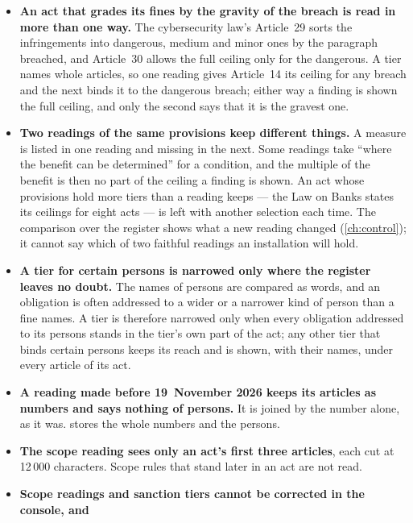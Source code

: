 \begin{itemize}
    law what Article~83(4) and (5) of the GDPR lists: only an article of the act being read
    is given with its sanction provisions. Such a tier names the article that holds the list
    and reaches no finding; the finding is shown the regulation's own ceiling.
  \item \textbf{An act that grades its fines by the gravity of the breach is read in more
    than one way.} The cybersecurity law's Article~29 sorts the infringements into dangerous,
    medium and minor ones by the paragraph breached, and Article~30 allows the full ceiling
    only for the dangerous. A tier names whole articles, so one reading gives Article~14 its
    ceiling for any breach and the next binds it to the dangerous breach; either way a
    finding is shown the full ceiling, and only the second says that it is the gravest one.
  \item \textbf{Two readings of the same provisions keep different things.} A measure is
    listed in one reading and missing in the next. Some readings take \enquote{where the
    benefit can be determined} for a condition, and the multiple of the benefit is then no
    part of the ceiling a finding is shown. An act whose provisions hold more tiers than a
    reading keeps --- the Law on Banks states its ceilings for eight acts --- is left with
    another selection each time. The comparison over the register shows what a new reading
    changed (\cref{ch:control}); it cannot say which of two faithful readings an
    installation will hold.
  \item \textbf{A tier for certain persons is narrowed only where the register leaves no
    doubt.} The names of persons are compared as words, and an obligation is often addressed
    to a wider or a narrower kind of person than a fine names. A tier is therefore narrowed
    only when every obligation addressed to its persons stands in the tier's own part of the
    act; any other tier that binds certain persons keeps its reach and is shown, with their
    names, under every article of its act.
  \item \textbf{A reading made before 19~November 2026 keeps its articles as numbers and
    says nothing of persons.} It is joined by the number alone, as it was.
     stores the whole numbers and the persons.
  \item \textbf{The scope reading sees only an act's first three articles}, each cut at
    12\,000 characters. Scope rules that stand later in an act are not read.
  \item \textbf{Scope readings and sanction tiers cannot be corrected in the console, and
}
\end{itemize}

